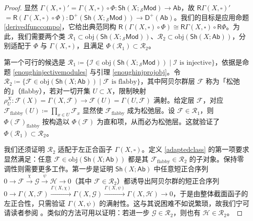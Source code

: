 \begin{proof}
显然 $\Gamma(X,\square)'=\Gamma(X,\square)\circ\Phi:\mathsf{Sh}(X;{}_{\mathcal{S}}\mathsf{Mod})\rightarrow\mathsf{Ab}$，故 $\mathsf{R}\Gamma(X,\square)'$ $=\mathsf{R}(\Gamma(X,\square)\circ\Phi):\mathsf{D^+}(\mathsf{Sh}(X;{}_{\mathcal{S}}\mathsf{Mod}))\rightarrow\mathsf{D^+}(\mathsf{Ab})$。我们的目标是应用命题 \ref{derivedfunccompo}，它给出典范同构 $\mathsf{R}(\Gamma(X,\square)\circ\Phi)\cong\mathsf{R}\Gamma(X,\square)\circ\mathsf{R}\Phi$。为此，我们需要两个类 $\mathcal{R}_1\subset\text{obj}(\mathsf{Sh}(X;{}_{\mathcal{S}}\mathsf{Mod}))$、$\mathcal{R}_2\subset\text{obj}(\mathsf{Sh}(X;\mathsf{Ab}))$，分别适配于 $\Phi$ 与 $\Gamma(X,\square)$，且满足 $\Phi(\mathcal{R}_1)\subset\mathcal{R}_2$。

第一个可行的候选是 $\mathcal{R}_1\coloneqq\{\mathcal{I}\in\text{obj}(\mathsf{Sh}(X;{}_{\mathcal{S}}\mathsf{Mod}))\mid \mathcal{I}\text{ is injective}\}$，依据是命题 \ref{enoughinjectivemodules} 与引理 \ref{enoughinjprojobj}。令 $\mathcal{R}_2\coloneqq\{\mathcal{F}\in\text{obj}(\mathsf{Sh}(X;\mathsf{Ab}))\mid \mathcal{F}\text{ is flabby}\}$，其中阿贝尔群层 $\mathcal{F}$ 称为「松弛的」（flabby），若对一切开集 $U\subset X$，限制映射 $\rho^X_U:\mathcal{F}(X)=\Gamma(X,\mathcal{F})\rightarrow\mathcal{F}(U)=\Gamma(U,\mathcal{F})$ 满射。给定层 $\mathcal{F}$，对应 $\mathcal{F}_\text{flabby}(U)\coloneqq\prod_{x\in U}\mathcal{F}_x$ 显然使 $\mathcal{F}_\text{flabby}$ 成为松弛层。设 $\mathcal{F}\in\mathcal{R}_1$，则 $\Phi(\mathcal{F})_\text{flabby}$ 按构造以 $\Phi(\mathcal{F})$ 为直和项，从而必为松弛层。这就验证了 $\Phi(\mathcal{R}_1)\subset\mathcal{R}_2$。

我们还须证明 $\mathcal{R}_2$ 适配于左正合函子 $\Gamma(X,\square)$。定义 \ref{adaptedclass} 的第一项要求显然满足：任意 $\mathcal{F}\in\text{obj}(\mathsf{Sh}(X;\mathsf{Ab}))$ 都是其 $\mathcal{F}_\text{flabby}\in\mathcal{R}_2$ 的子对象。保持零调性则需要更多工作。第一步是证明 $\mathsf{Sh}(X;\mathsf{Ab})$ 中任意短正合序列 $0\rightarrow\mathcal{F}\xrightarrow{\chi}\mathcal{G}\xrightarrow{\psi}\mathcal{H}\rightarrow 0$（其中 $\mathcal{F}\in\mathcal{R}_2$）都诱导出阿贝尔群的短正合序列 $0\rightarrow\Gamma(X,\mathcal{F})\xrightarrow{\Gamma(X,\chi)}\Gamma(X,\mathcal{G})\xrightarrow{\Gamma(X,\psi)}\Gamma(X,\mathcal{H})\rightarrow 0$，于是由整体截面函子的左正合性，只需验证 $\Gamma(X,\psi)$ 的满射性。这与其说困难不如说繁琐，故我们宁可请读者参阅 \cite[Theorem III.8.3a)]{[GM03]}。类似的方法可用以证明：若进一步 $\mathcal{G}\in\mathcal{R}_2$，则也有 $\mathcal{H}\in\mathcal{R}_2$。


\end{proof}
